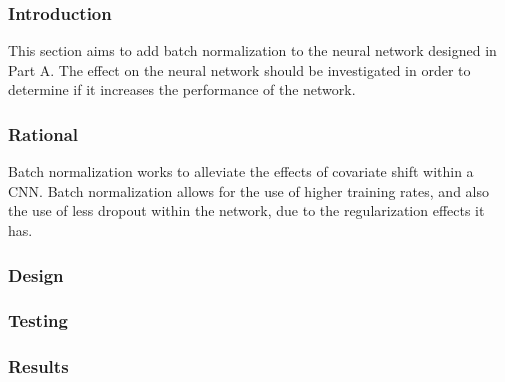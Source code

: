 \subsubsection{Introduction}

This section aims to add batch normalization to the neural network designed in
Part A. The effect on the neural network should be investigated in order to
determine if it increases the performance of the network.

\subsubsection{Rational}

Batch normalization works to alleviate the effects of covariate shift within a
CNN. Batch normalization allows for the use of higher training rates, and also
the use of less dropout within the network, due to the regularization effects it
has.

\subsubsection{Design}

\subsubsection{Testing}

\subsubsection{Results}

